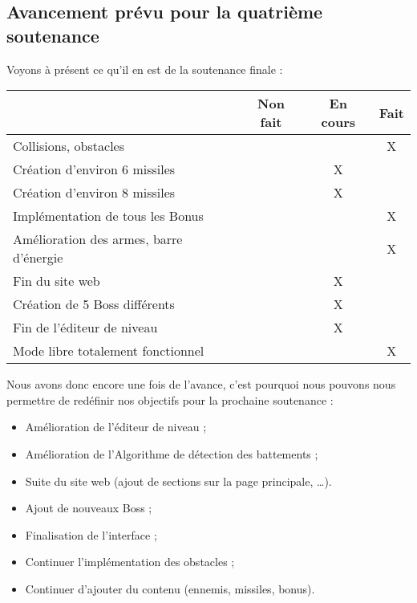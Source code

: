 \documentclass[12pt,a4paper]{article}
\begin{document}
	\subsection{Avancement prévu pour la quatrième soutenance}
	Voyons à présent ce qu'il en est de la soutenance finale :
	\begin{center}
		\begin{tabular}{|p{9cm}|c|c|c|}
		\hline
			& Non fait & En cours & Fait \\ \hline
			Collisions, obstacles & & & X\\ \hline
			Création d'environ 6 missiles & & X & \\ \hline
			Création d'environ 8 missiles & & X & \\ \hline
			Implémentation de tous les Bonus & & & X\\ \hline
			Amélioration des armes, barre d'énergie & & & X\\ \hline
			Fin du site web & & X & \\ \hline
			Création de 5 Boss différents & & X &\\ \hline
			Fin de l'éditeur de niveau & & X &\\ \hline
			Mode libre totalement fonctionnel & & & X\\ \hline
		\end{tabular}
	\end{center}
	Nous avons donc encore une fois de l'avance, c'est pourquoi nous pouvons nous permettre de redéfinir nos objectifs pour la prochaine soutenance :
	\begin{itemize}
		\item Amélioration de l'éditeur de niveau ;
		\item Amélioration de l'Algorithme de détection des battements ;
		\item Suite du site web (ajout de sections sur la page principale, \ldots).
		\item Ajout de nouveaux Boss ;
		\item Finalisation de l'interface ;
		\item Continuer l'implémentation des obstacles ;
		\item Continuer d'ajouter du contenu (ennemis, missiles, bonus).
	\end{itemize}
\newpage
\end{document}
